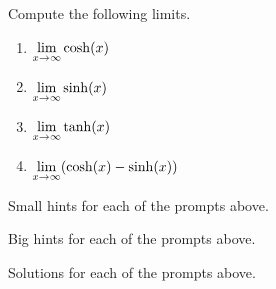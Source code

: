 \begin{activity} \label{A:6.8.1} Compute the following limits.
\bmtwo
\begin{enumerate}[1)]
\item $\displaystyle \lim_{x \rightarrow \infty} \cosh (x)$
\item $\displaystyle \lim_{x \rightarrow \infty} \sinh (x) $
\item $\displaystyle \lim_{x \rightarrow \infty} \tanh (x) $
\item $\displaystyle \lim_{x \rightarrow \infty} (\cosh (x) - \sinh (x)) $
\end{enumerate}
\emtwo
\end{activity}
\begin{smallhint}
\ba
	\item Small hints for each of the prompts above.
\ea
\end{smallhint}
\begin{bighint}
\ba
	\item Big hints for each of the prompts above.
\ea
\end{bighint}
\begin{activitySolution}
\ba
	\item Solutions for each of the prompts above.
\ea
\end{activitySolution}
\aftera